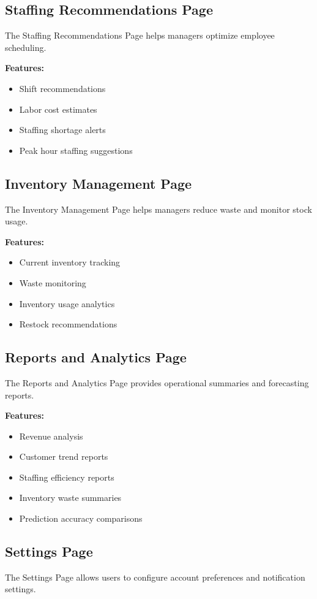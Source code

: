 \documentclass[12pt]{article}
\begin{document}
\subsection{Staffing Recommendations Page}
The Staffing Recommendations Page helps managers optimize employee scheduling.

\textbf{Features:}
\begin{itemize}
\item Shift recommendations
\item Labor cost estimates
\item Staffing shortage alerts
\item Peak hour staffing suggestions
\end{itemize}

\subsection{Inventory Management Page}
The Inventory Management Page helps managers reduce waste and monitor stock usage.

\textbf{Features:}
\begin{itemize}
\item Current inventory tracking
\item Waste monitoring
\item Inventory usage analytics
\item Restock recommendations
\end{itemize}

\subsection{Reports and Analytics Page}
The Reports and Analytics Page provides operational summaries and forecasting reports.

\textbf{Features:}
\begin{itemize}
\item Revenue analysis
\item Customer trend reports
\item Staffing efficiency reports
\item Inventory waste summaries
\item Prediction accuracy comparisons
\end{itemize}

\subsection{Settings Page}
The Settings Page allows users to configure account preferences and notification settings.
\end{document}
